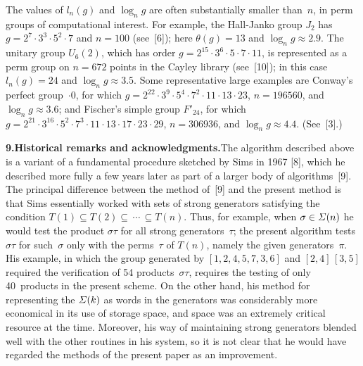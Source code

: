 The values of $l_n(g)$ and $\log_n g$ are often substantially smaller than~$n$,
in perm groups of computational interest. For example, the Hall-Janko group
$J_2$ has $g=2^7\cdot3^3\cdot5^2\cdot7$ and $n=100$ (see~[6]); here
$\theta(g)=13$ and $\log_n g\approx2.9$. The unitary group
$U_6(2)$, which has order $g=2^{15}\cdot3^6\cdot5\cdot7\cdot11$, is
represented as a perm group on $n=672$ points in 
the Cayley library (see~[10]);
 in this case $l_n(g)=24$ and $\log_n g\approx3.5$.
Some representative large examples are Conway's perfect group~$\cdot0$,
for which $g=2^{22}\cdot3^9\cdot5^4\cdot7^2\cdot11\cdot13\cdot23$, $n=
196560$, and $\log_n g\approx3.6$; and Fischer's simple group
$F'_{24}$, for which $g=2^{21}\cdot3^{16}\cdot5^2\cdot7^3\cdot11\cdot13\cdot
17\cdot23\cdot29$, $n=306936$, and $\log_n g\approx4.4$. (See~[3].)

\medskip
\noindent
{\bf 9.\enspace Historical remarks and acknowledgments.}\enspace The algorithm
described above is a variant of a fundamental procedure sketched by
Sims in 1967 [8], which he described more fully a few years later 
as part of a larger body of algorithms~[9].
The principal difference between the method of~[9] and the present
method is that Sims essentially worked with sets of strong generators
satisfying the condition $T(1)\subseteq
T(2)\subseteq\,\cdots\,\subseteq
T(n)$. Thus, for example, when $\sigma\in{\mit\Sigma}(n)$ he would test
the product $\sigma\tau$ for all strong generators~$\tau$; the present
algorithm tests $\sigma\tau$ for such~$\sigma$ only with the
perms~$\tau$ of $T(n)$, namely the given generators~$\pi$.
His example, in which the group generated by $[1,2,4,5,7,3,6]$ and
$[2,4]\,[3,5]$ required the verification of 54 products~$\sigma\tau$,
requires the testing  of only 40~products in the present scheme.
On the other hand, his method for representing the ${\mit\Sigma}(k)$ as
words in the generators was considerably more economical in its use of
storage space, and space was an extremely critical resource at the
time. Moreover, his way of maintaining strong generators blended well
with the other routines in his system, so it is not clear that he
would have regarded the methods of the present paper as an
improvement.

